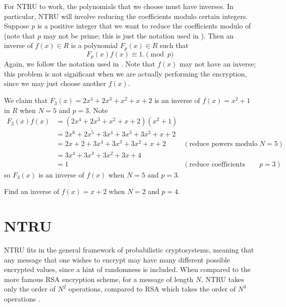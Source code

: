 For NTRU to work, the polynomials that we choose must have inverses. In particular, NTRU will involve reducing the coefficients modulo certain integers. Suppose $p$ is a positive integer that we want to reduce the coefficients modulo of (note that $p$ may not be prime; this is just the notation used in \cite[\S~1.1]{hoffstein_pipher_silverman_1998}). Then an inverse of $f(x) \in R$ is a polynomial $F_p(x) \in R$ such that
\[
    F_p(x)f(x) \equiv 1. \pmod p
\]
Again, we follow the notation used in \cite{hoffstein_pipher_silverman_1998}. Note that $f(x)$ may not have an inverse; this problem is not significant when we are actually performing the encryption, since we may just choose another $f(x)$.

\begin{example}
    We claim that $F_3(x) = 2x^4 + 2x^3 + x^2 + x + 2$ is an inverse of $f(x) = x^2 + 1$ in $R$ when $N = 5$ and $p = 3$. Note
    \begin{align*}
        F_3(x)f(x) &= (2x^4 + 2x^3 + x^2 + x + 2)(x^2+1)\\
        &= 2x^6 + 2x^5 + 3x^4 + 3x^3 + 3x^2 + x + 2\\
        &= 2x + 2 + 3x^4 + 3x^3 + 3x^2 + x + 2 & (\text{reduce powers modulo }N = 5)\\
        &= 3x^4 + 3x^3 + 3x^2 + 3x + 4\\
        &= 1 & (\text{reduce coefficients modulo } p = 3)
    \end{align*}
    so $F_3(x)$ is an inverse of $f(x)$ when $N = 5$ and $p = 3$.
\end{example}

\begin{exercise}
    Find an inverse of $f(x) = x + 2$ when $N = 2$ and $p = 4$.
\end{exercise}

\section{NTRU}
NTRU fits in the general framework of probabilistic cryptosystems, meaning that any message that one wishes to encrypt may have many different possible encrypted values, since a hint of randomness is included. When compared to the more famous RSA encryption scheme, for a message of length $N$, NTRU takes only the order of $N^2$ operations, compared to RSA which takes the order of $N^3$ operations \cite[p.~268]{hoffstein_pipher_silverman_1998}.

